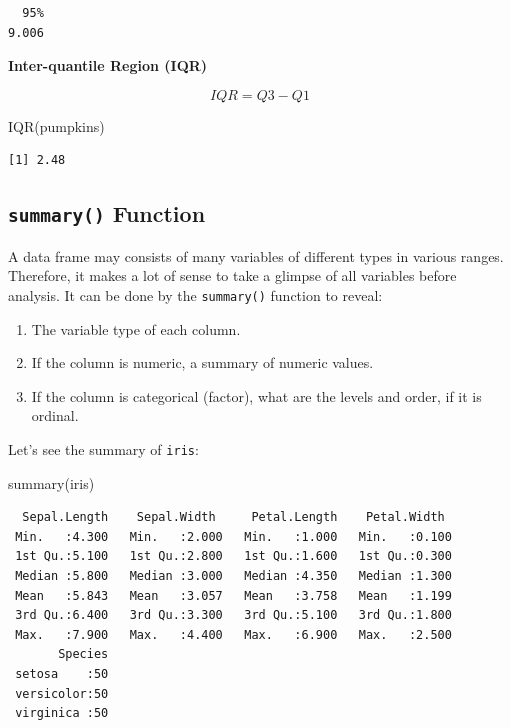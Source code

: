 \documentclass[
  letterpaper,
]{book}
\newenvironment{Shaded}{\begin{snugshade}}{\end{snugshade}}
\newcommand{\FunctionTok}[1]{\textcolor[rgb]{0.28,0.35,0.67}{#1}}
\newcommand{\NormalTok}[1]{\textcolor[rgb]{0.00,0.23,0.31}{#1}}
\begin{document}
\begin{verbatim}
  95% 
9.006 
\end{verbatim}

\textbf{Inter-quantile Region (IQR)}

\[IQR = Q3 - Q1\]

\begin{Shaded}
\begin{Highlighting}[]
\FunctionTok{IQR}\NormalTok{(pumpkins)}
\end{Highlighting}
\end{Shaded}

\begin{verbatim}
[1] 2.48
\end{verbatim}

\subsection*{\texorpdfstring{\texttt{summary()}
Function}{summary() Function}}\label{summary-function}

A data frame may consists of many variables of different types in
various ranges. Therefore, it makes a lot of sense to take a glimpse of
all variables before analysis. It can be done by the \texttt{summary()}
function to reveal:

\begin{enumerate}
\def\labelenumi{\arabic{enumi}.}
\item
  The variable type of each column.
\item
  If the column is numeric, a summary of numeric values.
\item
  If the column is categorical (factor), what are the levels and order,
  if it is ordinal.
\end{enumerate}

Let's see the summary of \texttt{iris}:

\begin{Shaded}
\begin{Highlighting}[]
\FunctionTok{summary}\NormalTok{(iris)}
\end{Highlighting}
\end{Shaded}

\begin{verbatim}
  Sepal.Length    Sepal.Width     Petal.Length    Petal.Width   
 Min.   :4.300   Min.   :2.000   Min.   :1.000   Min.   :0.100  
 1st Qu.:5.100   1st Qu.:2.800   1st Qu.:1.600   1st Qu.:0.300  
 Median :5.800   Median :3.000   Median :4.350   Median :1.300  
 Mean   :5.843   Mean   :3.057   Mean   :3.758   Mean   :1.199  
 3rd Qu.:6.400   3rd Qu.:3.300   3rd Qu.:5.100   3rd Qu.:1.800  
 Max.   :7.900   Max.   :4.400   Max.   :6.900   Max.   :2.500  
       Species  
 setosa    :50  
 versicolor:50  
 virginica :50  
                
                
                
\end{verbatim}
\end{document}
